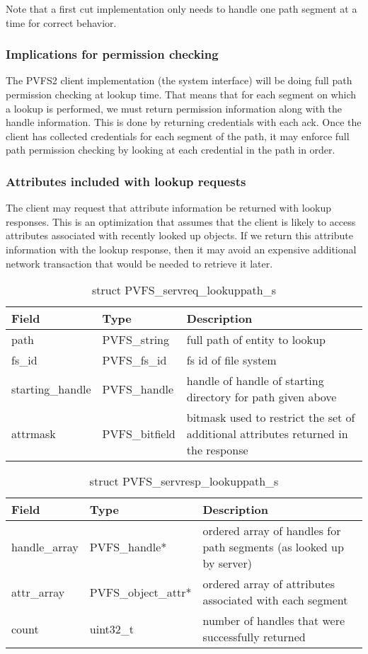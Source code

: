 \documentclass[11pt, letterpaper]{article} %
\begin{document}
Note that a first cut implementation only needs to handle one path
segment at a time for correct behavior.

\subsubsection{Implications for permission checking}

The PVFS2 client implementation (the system interface) will be doing
full path permission checking at lookup time.  That means that for each
segment on which a lookup is performed, we must return permission
information along with the handle information.  This is done by
returning credentials with each ack.  Once the client has collected
credentials for each segment of the path, it may enforce full path
permission checking by looking at each credential in the path in order. 

\subsubsection{Attributes included with lookup requests}

The client may request that attribute information be returned with
lookup responses.  This is an optimization that assumes that the client
is likely to access attributes associated with recently looked up
objects.  If we return this attribute information with the lookup
response, then it may avoid an expensive additional network
transaction that would be needed to retrieve it later.

\begin{table}[H]
\begin{tabular}{|l|l|l|}
\hline
Field & Type & Description \\
\hline
\hline
path & PVFS\_string & full path of entity to lookup\\
\hline
fs\_id & PVFS\_fs\_id & fs id of file system\\
\hline
starting\_handle & PVFS\_handle & handle of handle of starting directory
for path given above\\
\hline 
attrmask & PVFS\_bitfield & bitmask used to restrict the set of
additional attributes returned in the response\\
\hline
\end{tabular}
\caption{struct PVFS\_servreq\_lookuppath\_s
\label{tab:reqlookuppath}}
\end{table}

\begin{table}[H]
\begin{tabular}{|l|l|l|}
\hline
Field & Type & Description \\
\hline
\hline
handle\_array & PVFS\_handle* & ordered array of handles for path segments (as looked up by server)\\
\hline
attr\_array & PVFS\_object\_attr* & ordered array of attributes
associated with each segment\\
\hline 
count & uint32\_t & number of handles that were successfully
returned\\
\hline
\end{tabular}
\caption{struct PVFS\_servresp\_lookuppath\_s \label{tab:resplookuppath}}
\end{table}
\end{document}
